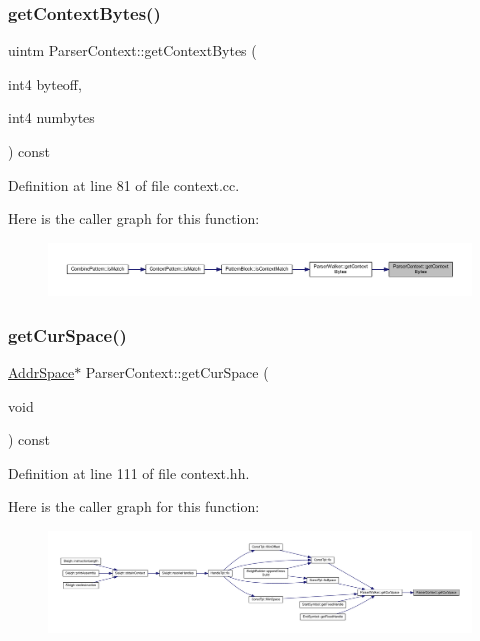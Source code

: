 \subsubsection{\texorpdfstring{getContextBytes()}{getContextBytes()}}
{\footnotesize\ttfamily uintm Parser\+Context\+::get\+Context\+Bytes (\begin{DoxyParamCaption}\item[{int4}]{byteoff,  }\item[{int4}]{numbytes }\end{DoxyParamCaption}) const}



Definition at line 81 of file context.\+cc.

Here is the caller graph for this function\+:
\nopagebreak
\begin{figure}[H]
\begin{center}
\leavevmode
\includegraphics[width=350pt]{class_parser_context_a9f3ffbc9719247bd2ef63636eff6b0d3_icgraph}
\end{center}
\end{figure}
\mbox{\label{class_parser_context_adf3c2cc3d08bbb0da16f307629566942}} 
\subsubsection{\texorpdfstring{getCurSpace()}{getCurSpace()}}
{\footnotesize\ttfamily \mbox{\hyperlink{class_addr_space}{Addr\+Space}}$\ast$ Parser\+Context\+::get\+Cur\+Space (\begin{DoxyParamCaption}\item[{void}]{ }\end{DoxyParamCaption}) const\hspace{0.3cm}{\ttfamily [inline]}}



Definition at line 111 of file context.\+hh.

Here is the caller graph for this function\+:
\nopagebreak
\begin{figure}[H]
\begin{center}
\leavevmode
\includegraphics[width=350pt]{class_parser_context_adf3c2cc3d08bbb0da16f307629566942_icgraph}
\end{center}
\end{figure}
\mbox{\label{class_parser_context_a8a6526b4b2c1d0ee6cfee2cd5935dcbc}} 
